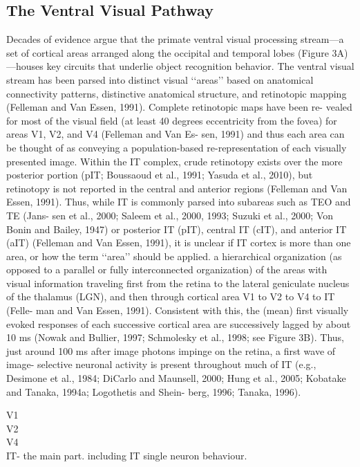 \subsection{The Ventral Visual Pathway}
Decades of evidence argue that
the primate ventral visual processing
stream—a set of cortical areas arranged
along the occipital and temporal lobes
(Figure 3A)—houses key circuits that underlie object recognition
behavior.
The ventral visual stream has been parsed into distinct visual
‘‘areas’’ based on anatomical connectivity patterns, distinctive anatomical structure, and retinotopic mapping (Felleman and
Van Essen, 1991). Complete retinotopic maps have been re-
vealed for most of the visual field (at least 40 degrees eccentricity
from the fovea) for areas V1, V2, and V4 (Felleman and Van Es-
sen, 1991) and thus each area can be thought of as conveying
a population-based re-representation of each visually presented
image. Within the IT complex, crude retinotopy exists over the
more posterior portion (pIT; Boussaoud et al., 1991; Yasuda
et al., 2010), but retinotopy is not reported in the central and
anterior regions (Felleman and Van Essen, 1991). Thus, while
IT is commonly parsed into subareas such as TEO and TE (Jans-
sen et al., 2000; Saleem et al., 2000, 1993; Suzuki et al., 2000;
Von Bonin and Bailey, 1947) or posterior IT (pIT), central IT
(cIT), and anterior IT (aIT) (Felleman and Van Essen, 1991), it is
unclear if IT cortex is more than one area, or how the term
‘‘area’’ should be applied.
a hierarchical
organization (as opposed to a parallel or fully interconnected
organization) of the areas with visual information traveling first
from the retina to the lateral geniculate nucleus of the thalamus
(LGN), and then through cortical area V1 to V2 to V4 to IT (Felle-
man and Van Essen, 1991). Consistent with this, the (mean) first
visually evoked responses of each successive cortical area are
successively lagged by about 10 ms (Nowak and Bullier, 1997;
Schmolesky et al., 1998; see Figure 3B). Thus, just around 100 ms after
image photons impinge on the retina, a first wave of image-
selective neuronal activity is present throughout much of IT
(e.g., Desimone et al., 1984; DiCarlo and Maunsell, 2000; Hung
et al., 2005; Kobatake and Tanaka, 1994a; Logothetis and Shein-
berg, 1996; Tanaka, 1996).

V1\\
V2\\
V4\\
IT- the main part. including IT single neuron behaviour.\\
